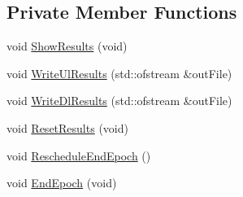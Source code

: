 \subsection*{Private Member Functions}
\begin{DoxyCompactItemize}
\item 
void \hyperlink{classns3_1_1RadioBearerStatsCalculator_a78157d45a5b8dd3a1b054c72ea35442c}{Show\+Results} (void)
\item 
void \hyperlink{classns3_1_1RadioBearerStatsCalculator_abc56a12815660aad7e3144b9402ca82e}{Write\+Ul\+Results} (std\+::ofstream \&out\+File)
\item 
void \hyperlink{classns3_1_1RadioBearerStatsCalculator_a9f82c4c84f1160d648f4a21d6e068b4b}{Write\+Dl\+Results} (std\+::ofstream \&out\+File)
\item 
void \hyperlink{classns3_1_1RadioBearerStatsCalculator_a61fc84334a78fa6f694b130e4037a2e9}{Reset\+Results} (void)
\item 
void \hyperlink{classns3_1_1RadioBearerStatsCalculator_a1c0896f7d48a7b0d342c87f1755ffd68}{Reschedule\+End\+Epoch} ()
\item 
void \hyperlink{classns3_1_1RadioBearerStatsCalculator_a2dc0a214122722f1a58c44492f565b47}{End\+Epoch} (void)
\end{DoxyCompactItemize}
